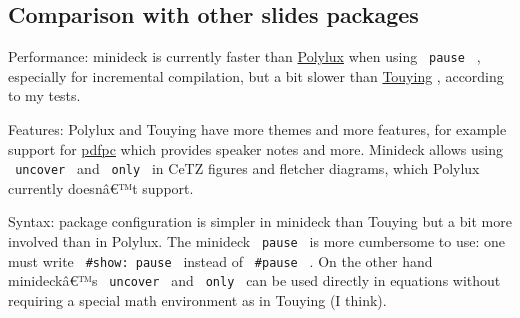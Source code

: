 \begin{Shaded}
\begin{Highlighting}[]

\NormalTok{\#slide(steps: 2)[}



\NormalTok{  )}
  
\NormalTok{]}
\end{Highlighting}
\end{Shaded}

\subsection{Comparison with other slides
packages}\label{comparison-with-other-slides-packages}

Performance: minideck is currently faster than
\href{https://typst.app/universe/package/polylux/}{Polylux} when using
\texttt{\ pause\ } , especially for incremental compilation, but a bit
slower than \href{https://typst.app/universe/package/touying}{Touying} ,
according to my tests.

Features: Polylux and Touying have more themes and more features, for
example support for \href{https://pdfpc.github.io/}{pdfpc} which
provides speaker notes and more. Minideck allows using
\texttt{\ uncover\ } and \texttt{\ only\ } in CeTZ figures and fletcher
diagrams, which Polylux currently doesnâ€™t support.

Syntax: package configuration is simpler in minideck than Touying but a
bit more involved than in Polylux. The minideck \texttt{\ pause\ } is
more cumbersome to use: one must write \texttt{\ \#show:\ pause\ }
instead of \texttt{\ \#pause\ } . On the other hand minideckâ€™s
\texttt{\ uncover\ } and \texttt{\ only\ } can be used directly in
equations without requiring a special math environment as in Touying (I
think).


